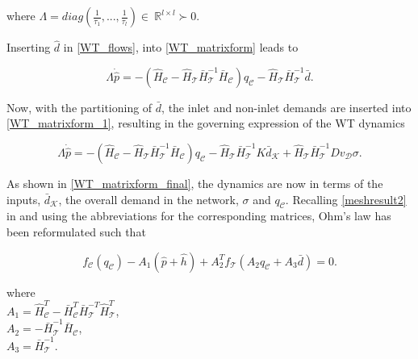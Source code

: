 where $\Lambda = diag(\frac{1}{\tau_1},... ,\frac{1}{\tau_l}) \in \: \mathbb{R}^{l \times l} \succ 0$. 

Inserting $\hat{d}$ in \eqref{WT_flows}, into \eqref{WT_matrixform} leads to

\begin{equation}
\label{WT_matrixform_1}
\Lambda \dot{\hat{p}} = - (\hat{H}_{\mathcal{C}} - \hat{H}_{\mathcal{T}} \bar{H}^{-1}_{\mathcal{T}}\bar{H}_{\mathcal{C}})  q_\mathcal{C}  - \hat{H}_{\mathcal{T}} \bar{H}^{-1}_{\mathcal{T}} \bar{d}.
\end{equation}

Now, with the partitioning of $\bar{d}$, the inlet and non-inlet demands are inserted into \eqref{WT_matrixform_1}, resulting in the governing expression of the WT dynamics

\begin{equation}
\label{WT_matrixform_final}
\Lambda \dot{\hat{p}} = - (\hat{H}_{\mathcal{C}} - \hat{H}_{\mathcal{T}} \bar{H}^{-1}_{\mathcal{T}}\bar{H}_{\mathcal{C}})  q_\mathcal{C}  - \hat{H}_{\mathcal{T}} \bar{H}^{-1}_{\mathcal{T}} K \bar{d}_{\mathcal{K}} + \hat{H}_{\mathcal{T}} \bar{H}^{-1}_{\mathcal{T}} D v_{\mathcal{D}} \sigma .
\end{equation}

As shown in \eqref{WT_matrixform_final}, the dynamics are now in terms of the inputs, $\bar{d}_{\mathcal{K}}$, the overall demand in the network, $\sigma$ and $q_\mathcal{C}$. Recalling \eqref{meshresult2} in  and using the abbreviations for the corresponding matrices, Ohm's law has been reformulated such that

 \begin{equation}
\label{meshresult2_WT_model}
f_{\mathcal{C}}(q_\mathcal{C}) -A_1(\hat{p} + \hat{h}) + A_2^T f_{\mathcal{T}}(A_2 q_\mathcal{C} + A_3 \bar{d}) = 0.
\end{equation} 

\begin{minipage}[t]{0.4\textwidth}
where\\
\hspace*{8mm} $A_1 = \hat{H}^T_{\mathcal{C}} -\bar{H}^T_{\mathcal{C}}\bar{H}^{-T}_{\mathcal{T}}\hat{H}^T_{\mathcal{T}}$, \vspace*{1.5mm}  \\
\hspace*{8mm} $A_2 = -\bar{H}^{-1}_{\mathcal{T}} \bar{H}_{\mathcal{C}} $, \vspace*{1.5mm}\\
\hspace*{8mm} $A_3 = \bar{H}^{-1}_{\mathcal{T}}$. 
\end{minipage}

